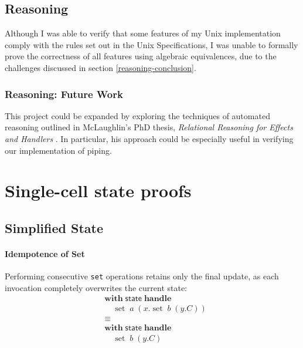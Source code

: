 \documentclass[logo,bsc,singlespacing,parskip]{infthesis}
\begin{document}
\section{Reasoning}
Although I was able to verify that some features of my Unix implementation comply with the rules set out in the Unix Specifications, I was unable to formally prove the correctness  of all features using algebraic equivalences, due to the challenges discussed in section \ref{reasoning-conclusion}.
\subsection*{Reasoning: Future Work}
This project could be expanded by exploring the techniques of automated reasoning outlined in McLaughlin's PhD thesis, \textit{Relational Reasoning for Effects and Handlers
} \cite{McLaughlin2020}. In particular, his approach could be especially useful in verifying our implementation of piping.

% 




\appendix

\chapter{Single-cell state proofs} 

\section{Simplified State} \label{full-simplified-single-cell-state-proof}

\subsubsection*{Idempotence of Set}
Performing consecutive \lstinline{set} operations retains only the final update, as each invocation completely overwrites the current state:
\[
\begin{aligned}
    &\mathsf{\textbf{with}} \; \mathsf{state} \; \mathsf{\textbf{handle}} \\
    &\quad \operatorname{set} \; a \; (x. \operatorname{set} \; b \; (y. C)) \\
    &\equiv \\
    &\mathsf{\textbf{with}} \; \mathsf{state} \; \mathsf{\textbf{handle}} \\
    &\quad \operatorname{set} \; b \; (y. C)
\end{aligned}
\]
\end{document}
